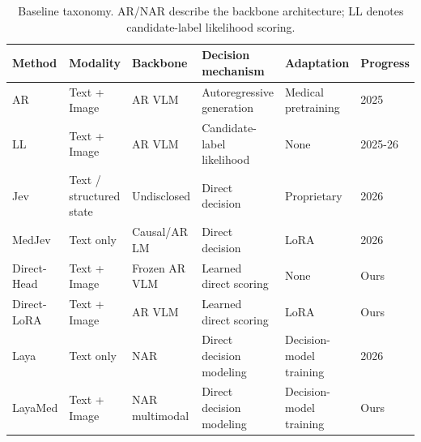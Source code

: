 \begin{table}[t]
\centering
\small
\setlength{\tabcolsep}{3pt}
\renewcommand{\arraystretch}{1.1}
\caption{Baseline taxonomy. AR/NAR describe the backbone architecture; LL denotes candidate-label likelihood scoring.}
\label{tab:cohorts}
\begin{tabular*}{\textwidth}{@{\extracolsep{\fill}}llllll@{}}
\toprule
\textcolor{PaperInk}{\textbf{Method}} & \textcolor{PaperInk}{\textbf{Modality}} & \textcolor{PaperInk}{\textbf{Backbone}} & \textcolor{PaperInk}{\textbf{Decision mechanism}} & \textcolor{PaperInk}{\textbf{Adaptation}} & \textcolor{PaperInk}{\textbf{Progress}} \\
\midrule
AR & Text + Image & AR VLM & Autoregressive generation & Medical pretraining & 2025 \\
LL & Text + Image & AR VLM & Candidate-label likelihood & None & 2025-26 \\
Jev & Text / structured state & Undisclosed & Direct decision & Proprietary & 2026 \\
MedJev & Text only & Causal/AR LM & Direct decision & LoRA & 2026 \\
Direct-Head & Text + Image & Frozen AR VLM & Learned direct scoring & None & Ours \\
Direct-LoRA & Text + Image & AR VLM & Learned direct scoring & LoRA & Ours \\
Laya & Text only & NAR & Direct decision modeling & Decision-model training & 2026 \\
LayaMed & Text + Image & NAR multimodal & Direct decision modeling & Decision-model training & Ours \\
\bottomrule
\end{tabular*}
\end{table}
